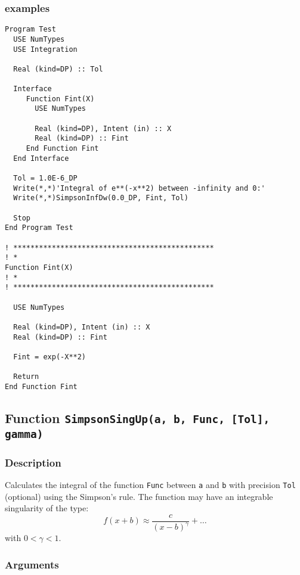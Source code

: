 \subsubsection{examples}

\begin{verbatim}
Program Test
  USE NumTypes
  USE Integration

  Real (kind=DP) :: Tol

  Interface 
     Function Fint(X)
       USE NumTypes

       Real (kind=DP), Intent (in) :: X
       Real (kind=DP) :: Fint
     End Function Fint
  End Interface

  Tol = 1.0E-6_DP
  Write(*,*)'Integral of e**(-x**2) between -infinity and 0:'
  Write(*,*)SimpsonInfDw(0.0_DP, Fint, Tol)

  Stop
End Program Test

! ***********************************************
! *
Function Fint(X)
! *  
! ***********************************************

  USE NumTypes

  Real (kind=DP), Intent (in) :: X
  Real (kind=DP) :: Fint

  Fint = exp(-X**2)

  Return
End Function Fint
\end{verbatim}

\subsection{Function \texttt{SimpsonSingUp(a, b, Func, [Tol], gamma)}}

\subsubsection{Description}

Calculates the integral of the function \texttt{Func} between
\texttt{a} and \texttt{b} with precision \texttt{Tol} (optional) using
the Simpson's rule. The function may have an integrable singularity of
the type:
\begin{displaymath}
  f(x+b) \approx \frac{c}{(x-b)^\gamma} +  \dots
\end{displaymath}
with $0<\gamma<1$.

\subsubsection{Arguments}

